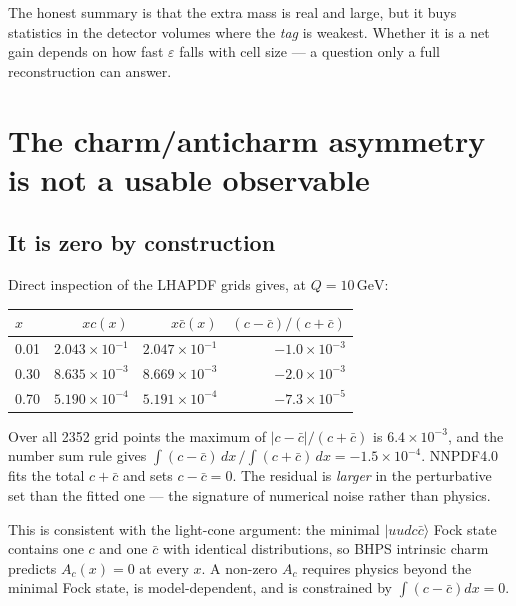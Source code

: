 \documentclass[11pt,a4paper]{article}
\newcommand{\GeV}{\,\mathrm{GeV}}
\begin{document}
\noindent
The honest summary is that the extra mass is real and large, but it buys
statistics in the detector volumes where the \emph{tag} is weakest. Whether it is
a net gain depends on how fast $\varepsilon$ falls with cell size --- a question
only a full reconstruction can answer.

\section{The charm/anticharm asymmetry is not a usable observable}
\label{sec:asym}

\subsection{It is zero by construction}
Direct inspection of the LHAPDF grids gives, at $Q=10\GeV$:
\begin{center}\small
\begin{tabular}{lrrr}
\toprule
$x$ & $x c(x)$ & $x\bar{c}(x)$ & $(c-\bar{c})/(c+\bar{c})$ \\
\midrule
0.01 & $2.043\times10^{-1}$ & $2.047\times10^{-1}$ & $-1.0\times10^{-3}$ \\
0.30 & $8.635\times10^{-3}$ & $8.669\times10^{-3}$ & $-2.0\times10^{-3}$ \\
0.70 & $5.190\times10^{-4}$ & $5.191\times10^{-4}$ & $-7.3\times10^{-5}$ \\
\bottomrule
\end{tabular}
\end{center}
Over all 2352 grid points the maximum of $|c-\bar{c}|/(c+\bar{c})$ is
$6.4\times10^{-3}$, and the number sum rule gives
$\int(c-\bar{c})\,dx\,/\!\int(c+\bar{c})\,dx = -1.5\times10^{-4}$. NNPDF4.0 fits
the total $c+\bar{c}$ and sets $c-\bar{c}=0$. The residual is \emph{larger} in
the perturbative set than the fitted one --- the signature of numerical noise
rather than physics.

This is consistent with the light-cone argument: the minimal
$|uudc\bar{c}\rangle$ Fock state contains one $c$ and one $\bar{c}$ with
identical distributions, so BHPS intrinsic charm predicts $A_c(x)=0$ at every
$x$. A non-zero $A_c$ requires physics beyond the minimal Fock state, is
model-dependent, and is constrained by $\int(c-\bar{c})dx=0$.
\end{document}
